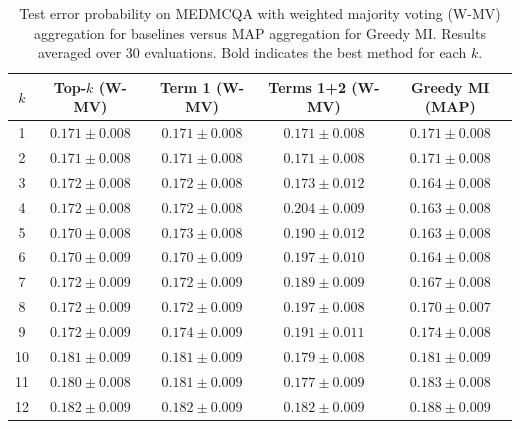 \documentclass{article}
\theoremstyle{plain}
\theoremstyle{definition}
\theoremstyle{remark}
\begin{document}
\begin{table}[ht]
\centering
\caption{Test error probability on MEDMCQA with weighted majority voting (W-MV) aggregation for baselines versus MAP aggregation for Greedy MI. Results averaged over 30 evaluations. Bold indicates the best method for each $k$.}
\label{tab:medmcqa_wmv_vs_map}
\small
\begin{tabular}{ccccc}
\toprule
$k$ & Top-$k$ (W-MV) & Term 1 (W-MV) & Terms 1+2 (W-MV) & Greedy MI (MAP) \\
\midrule
1  & $0.171 \pm 0.008$ & $0.171 \pm 0.008$ & $0.171 \pm 0.008$ & $0.171 \pm 0.008$ \\
2  & $0.171 \pm 0.008$ & $0.171 \pm 0.008$ & $0.171 \pm 0.008$ & $0.171 \pm 0.008$ \\
3  & $0.172 \pm 0.008$ & $0.172 \pm 0.008$ & $0.173 \pm 0.012$ & $\mathbf{0.164 \pm 0.008}$ \\
4  & $0.172 \pm 0.008$ & $0.172 \pm 0.008$ & $0.204 \pm 0.009$ & $\mathbf{0.163 \pm 0.008}$ \\
5  & $0.170 \pm 0.008$ & $0.173 \pm 0.008$ & $0.190 \pm 0.012$ & $\mathbf{0.163 \pm 0.008}$ \\
6  & $0.170 \pm 0.009$ & $0.170 \pm 0.009$ & $0.197 \pm 0.010$ & $\mathbf{0.164 \pm 0.008}$ \\
7  & $0.172 \pm 0.009$ & $0.172 \pm 0.009$ & $0.189 \pm 0.009$ & $\mathbf{0.167 \pm 0.008}$ \\
8  & $0.172 \pm 0.009$ & $0.172 \pm 0.009$ & $0.197 \pm 0.008$ & $\mathbf{0.170 \pm 0.007}$ \\
9  & $\mathbf{0.172 \pm 0.009}$ & $0.174 \pm 0.009$ & $0.191 \pm 0.011$ & $0.174 \pm 0.008$ \\
10 & $0.181 \pm 0.009$ & $0.181 \pm 0.009$ & $\mathbf{0.179 \pm 0.008}$ & $0.181 \pm 0.009$ \\
11 & $0.180 \pm 0.008$ & $0.181 \pm 0.009$ & $\mathbf{0.177 \pm 0.009}$ & $0.183 \pm 0.008$ \\
12 & $\mathbf{0.182 \pm 0.009}$ & $\mathbf{0.182 \pm 0.009}$ & $\mathbf{0.182 \pm 0.009}$ & $0.188 \pm 0.009$ \\
\bottomrule
\end{tabular}
\end{table}
\end{document}
